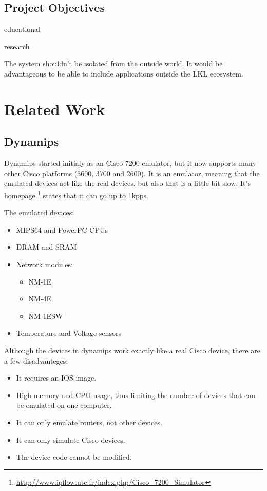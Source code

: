 \subsection{Project Objectives}
\label{sub-sec:proj-objectives}

educational

research

The system shouldn't be isolated from the outside world. It would be advantageous to be able
to include applications outside the LKL ecosystem.

\section{Related Work}
\label{sec:proj-related}

\subsection{Dynamips}

Dynamips started initialy as an Cisco 7200 emulator, but it now supports many other
Cisco platforms (3600, 3700 and 2600). It is an emulator, meaning that the emulated
devices act like the real devices, but also that is a little bit slow. It's
homepage \footnote{\url{http://www.ipflow.utc.fr/index.php/Cisco_7200_Simulator}}
states that it can go up to 1kpps. 

The emulated devices:
\begin{itemize}
  \item MIPS64 and PowerPC CPUs
  \item DRAM and SRAM
  \item Network modules:
    \begin{itemize}
      \item NM-1E
      \item NM-4E
      \item NM-1ESW
    \end{itemize}
  \item Temperature and Voltage sensors
\end{itemize}

Although the devices in dynamips work exactly like a real Cisco device, there are a few disadvanteges:
\begin{itemize}
  \item It requires an IOS image.
  \item High memory and CPU usage, thus limiting the number of devices that can be emulated on one computer.
  \item It can only emulate routers, not other devices.
  \item It can only simulate Cisco devices.
  \item The device code cannot be modified.
\end{itemize}

